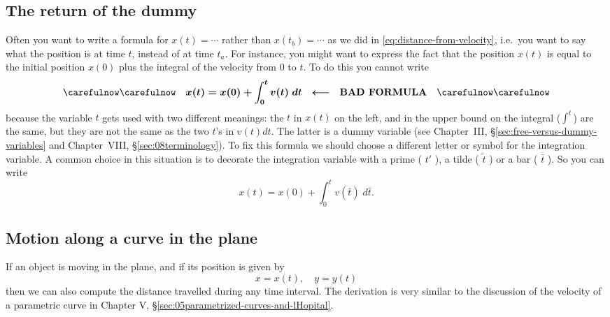 \subsection{The return of the dummy}
Often you want to write a formula for $x(t)=\cdots$ rather than $x(t_b)=\cdots$
as we did in \eqref{eq:distance-from-velocity}, i.e.\ you want to say what the
position is at time $t$, instead of at time $t_a$.  For instance, you might want
to express the fact that the position $x(t)$ is equal to the initial position
$x(0)$ plus the integral of the velocity from $0$ to $t$.  To do this you cannot
write
\[
\text{\carefulnow\carefulnow}\quad x(t) = x(0) + \int^{t}_{0} v(t)\; dt \quad
\boldmath{\longleftarrow} \quad \textbf{BAD FORMULA}
\quad\text{\carefulnow\carefulnow}
\]
because the variable $t$ gets used with two different meanings: the $t$ in
$x(t)$ on the left, and in the upper bound on the integral ($\int^t$) are the
same, but they are not the same as the two $t$'s in $v(t)dt$.  The latter is a
dummy variable (see Chapter~III, \S\ref{sec:free-versus-dummy-variables} and
Chapter~VIII, \S\ref{sec:08terminology}).  To fix this formula we should choose a different
letter or symbol for the integration variable.  A common choice in this
situation is to decorate the integration variable with a prime ( $t'$ ), a tilde
( $\tilde{t}$ ) or a bar ( $\bar t$ ).  So you can write
\[
x(t) = x(0) + \int^{t}_{0} v(\bar t)\; d\bar t.
\]

\subsection{Motion along a curve in the plane}
If an object is moving in the plane, and if its position is given by
\[
x = x(t), \quad y = y(t)
\]
then we can also compute the distance travelled during any time interval.  The
derivation is very similar to the discussion of the velocity of a parametric
curve in Chapter V, \S\ref{sec:05parametrized-curves-and-lHopital}.

